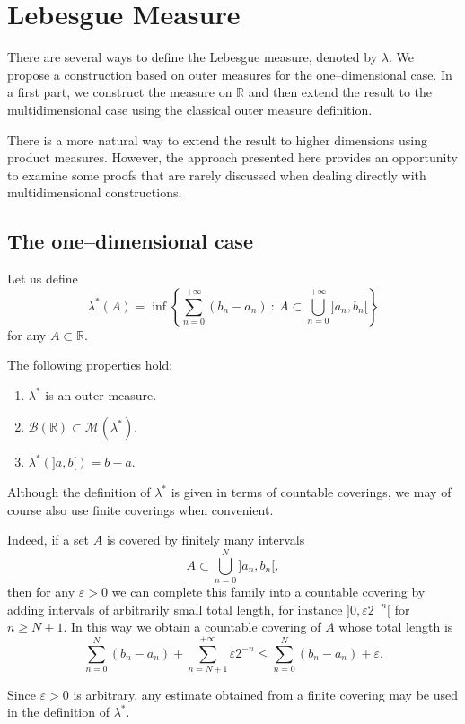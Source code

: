 \section{Lebesgue Measure}

There are several ways to define the Lebesgue measure, denoted by $\lambda$.
We propose a construction based on outer measures for the one–dimensional case.
In a first part, we construct the measure on $\mathbb{R}$ and then extend the
result to the multidimensional case using the classical outer measure definition.

There is a more natural way to extend the result to higher dimensions using
product measures. However, the approach presented here provides an opportunity
to examine some proofs that are rarely discussed when dealing directly with
multidimensional constructions.

\subsection{The one–dimensional case}

 Let us define
\[
	\lambda^*(A) =
	\inf\left\{
	\sum_{n=0}^{+\infty} (b_n-a_n)
	\ :\
	A \subset \bigcup_{n=0}^{+\infty} ]a_n,b_n[
	\right\}
\]
for any $A \subset \mathbb{R}$.

\prop The following properties hold:
\begin{enumerate}
	\item $\lambda^*$ is an outer measure.

	\item $\mathcal{B}(\mathbb{R}) \subset \mathcal{M}(\lambda^*)$.

	\item $\lambda^*(]a,b[)=b-a$.
\end{enumerate}

\rem Although the definition of $\lambda^*$ is given in terms
of countable coverings, we may of course also use finite coverings when
convenient.

Indeed, if a set $A$ is covered by finitely many intervals
\[
	A \subset \bigcup_{n=0}^N ]a_n,b_n[,
\]
then for any $\varepsilon>0$ we can complete this family into a countable
covering by adding intervals of arbitrarily small total length, for instance
$]0,\varepsilon 2^{-n}[$ for $n\ge N+1$. In this way we obtain a countable
covering of $A$ whose total length is
\[
	\sum_{n=0}^N (b_n-a_n) + \sum_{n=N+1}^{+\infty} \varepsilon 2^{-n}
	\le
	\sum_{n=0}^N (b_n-a_n)+\varepsilon.
\]

Since $\varepsilon>0$ is arbitrary, any estimate obtained from a finite
covering may be used in the definition of $\lambda^*$.

